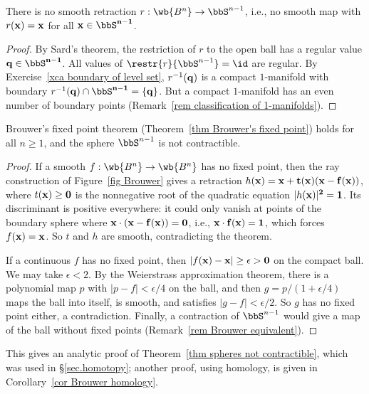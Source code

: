 \begin{thm}\label{thm no smooth retraction}
    There is no smooth retraction $r:\wb{B^n}\to\bbS^{n-1}$, i.e., no smooth map with $r(\bf{x})=\bf{x}$ for all $\bf{x}\in\bbS^{n-1}$.
\end{thm}
\begin{proof}
    By Sard's theorem, the restriction of $r$ to the open ball has a regular value $\bf{q}\in\bbS^{n-1}$. All values of $\restr{r}{\bbS^{n-1}}=\id$ are regular. By Exercise~\ref{xca boundary of level set}, $r^{-1}(\bf{q})$ is a compact $1$-manifold with boundary $r^{-1}(\bf{q})\cap\bbS^{n-1}=\{\bf{q}\}$. But a compact $1$-manifold has an even number of boundary points (Remark~\ref{rem classification of 1-manifolds}).
\end{proof}

\begin{cor}\label{cor Brouwer smooth}
    Brouwer's fixed point theorem (Theorem~\ref{thm Brouwer's fixed point}) holds for all $n\geq1$, and the sphere $\bbS^{n-1}$ is not contractible.
\end{cor}
\begin{proof}
    If a smooth $f:\wb{B^n}\to\wb{B^n}$ has no fixed point, then the ray construction of Figure~\ref{fig Brouwer} gives a retraction $h(\bf{x})=\bf{x}+t(\bf{x})(\bf{x}-f(\bf{x}))$, where $t(\bf{x})\geq0$ is the nonnegative root of the quadratic equation $\lvert h(\bf{x})\rvert^2=1$. Its discriminant is positive everywhere: it could only vanish at points of the boundary sphere where $\bf{x}\cdot(\bf{x}-f(\bf{x}))=0$, i.e., $\bf{x}\cdot f(\bf{x})=1$, which forces $f(\bf{x})=\bf{x}$. So $t$ and $h$ are smooth, contradicting the theorem.

    If a continuous $f$ has no fixed point, then $\lvert f(\bf{x})-\bf{x}\rvert\geq\epsilon>0$ on the compact ball. We may take $\epsilon<2$. By the Weierstrass approximation theorem, there is a polynomial map $p$ with $\lvert p-f\rvert<\epsilon/4$ on the ball, and then $g=p/(1+\epsilon/4)$ maps the ball into itself, is smooth, and satisfies $\lvert g-f\rvert<\epsilon/2$. So $g$ has no fixed point either, a contradiction. Finally, a contraction of $\bbS^{n-1}$ would give a map of the ball without fixed points (Remark~\ref{rem Brouwer equivalent}).
\end{proof}
This gives an analytic proof of Theorem~\ref{thm spheres not contractible}, which was used in \S\ref{sec.homotopy}; another proof, using homology, is given in Corollary~\ref{cor Brouwer homology}.

